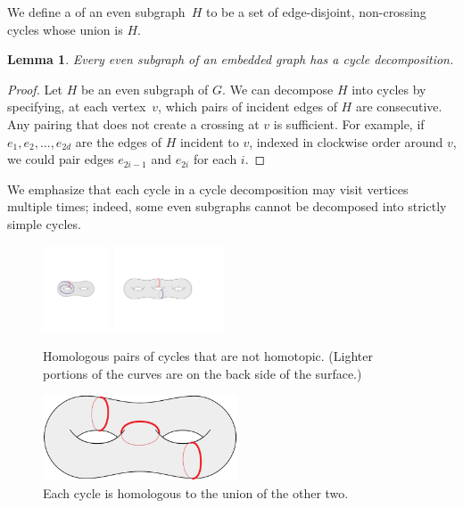 \documentclass[11pt,twoside]{article}
\newtheorem{lemma}[theorem]{Lemma}
\begin{document}
We define a  of an even subgraph~$H$ to be a set of edge-disjoint, non-crossing cycles whose union is $H$.
\begin{lemma}
\label{lem:decomposition}
Every even subgraph of an embedded graph has a cycle decomposition.
\end{lemma}

\begin{proof}
Let $H$ be an even subgraph of $G$.  We can decompose $H$ into cycles by specifying, at each vertex~$v$, which pairs of incident edges of $H$ are consecutive.  Any pairing that does not create a crossing at $v$ is sufficient.  For example, if $e_1, e_2, \dots, e_{2d}$ are the edges of $H$ incident to $v$, indexed in clockwise order around $v$, we could pair edges $e_{2i-1}$ and $e_{2i}$ for each $i$.  
\end{proof}

We emphasize that each cycle in a cycle decomposition may visit vertices multiple times; indeed, some even subgraphs cannot be decomposed into strictly simple cycles.


\begin{figure}[htb]
\centering
\includegraphics[height=1in]{Fig/homologous3}\qquad
\includegraphics[height=1in]{Fig/homologous2}
\caption{Homologous pairs of cycles that are not homotopic.  (Lighter portions of the curves are on the back side of the surface.)}
\label{F:homology}
\end{figure}

\begin{figure}[htb]
\centering
\includegraphics[height=1in]{Fig/homologous1}
\caption{Each cycle is homologous to the union of the other two.}
\label{F:homology2}
\end{figure}
\end{document}
